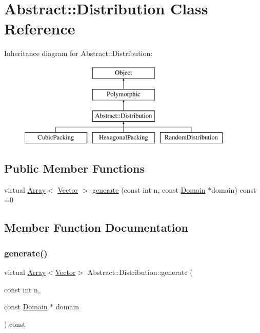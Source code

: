 \hypertarget{classAbstract_1_1Distribution}{}\section{Abstract\+:\+:Distribution Class Reference}
\label{classAbstract_1_1Distribution}
Inheritance diagram for Abstract\+:\+:Distribution\+:\begin{figure}[H]
\begin{center}
\leavevmode
\includegraphics[height=4.000000cm]{classAbstract_1_1Distribution}
\end{center}
\end{figure}
\subsection*{Public Member Functions}
\begin{DoxyCompactItemize}
\item 
virtual \hyperlink{classArray}{Array}$<$ \hyperlink{classBasicVector}{Vector} $>$ \hyperlink{classAbstract_1_1Distribution_aefb835b4c4d2d0a5f864bc2cee0492b2}{generate} (const int n, const \hyperlink{classAbstract_1_1Domain}{Domain} $\ast$domain) const =0
\end{DoxyCompactItemize}


\subsection{Member Function Documentation}
\hypertarget{classAbstract_1_1Distribution_aefb835b4c4d2d0a5f864bc2cee0492b2}{}\label{classAbstract_1_1Distribution_aefb835b4c4d2d0a5f864bc2cee0492b2} 
\subsubsection{\texorpdfstring{generate()}{generate()}}
{\footnotesize\ttfamily virtual \hyperlink{classArray}{Array}$<$\hyperlink{classBasicVector}{Vector}$>$ Abstract\+::\+Distribution\+::generate (\begin{DoxyParamCaption}\item[{const int}]{n,  }\item[{const \hyperlink{classAbstract_1_1Domain}{Domain} $\ast$}]{domain }\end{DoxyParamCaption}) const\hspace{0.3cm}{\ttfamily [pure virtual]}}

